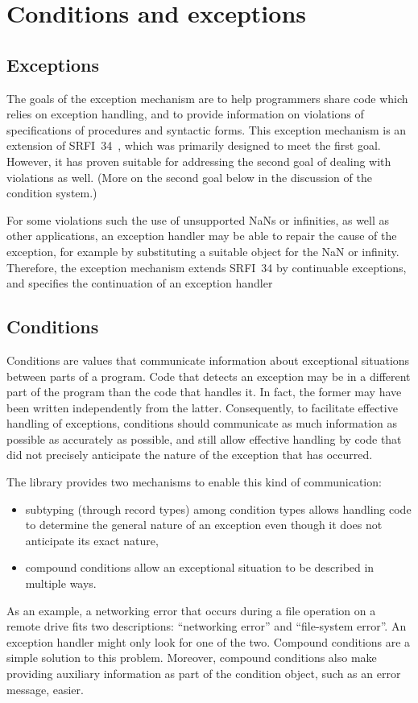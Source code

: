 \documentclass[twoside,twocolumn]{algol60}
\begin{document}
\chapter{Conditions and exceptions}

\section{Exceptions}

The goals of the exception mechanism are to help programmers share
code which relies on exception handling, and to provide information on
violations of specifications of procedures and syntactic forms.  This
exception mechanism is an extension of SRFI~34~\cite{srfi34}, which
was primarily designed to meet the first goal.  However, it has proven
suitable for addressing the second goal of dealing with violations as
well.   (More on the second goal below in the discussion of the
condition system.)

For some violations such the use of unsupported NaNs or infinities, as
well as other applications, an exception handler may be able to
repair the cause of the exception, for example by substituting a
suitable object for the NaN or infinity.  Therefore, the exception
mechanism extends SRFI~34 by continuable exceptions, and specifies the
continuation of an exception handler

\section{Conditions}

Conditions are values that communicate information about exceptional
situations between parts of a program. Code that detects an exception
may be in a different part of the program than the code that handles
it. In fact, the former may have been written independently from the
latter.  Consequently, to facilitate effective handling of exceptions,
conditions should communicate as much information as possible as
accurately as possible, and still allow effective handling by code
that did not precisely anticipate the nature of the exception that has
occurred.

The  library provides two mechanisms to
enable this kind of communication:
%
\begin{itemize}
\item subtyping (through record types) among condition types allows
  handling code to determine the general nature of an exception even
  though it does not anticipate its exact nature,
\item compound conditions allow an exceptional situation to be
  described in multiple ways.
\end{itemize}
%
As an example, a networking error that occurs during a file operation
on a remote drive fits two descriptions: ``networking error'' and
``file-system error''.  An exception handler might only look for one of
the two.  Compound conditions are a simple solution to this problem.
Moreover, compound conditions also make providing auxiliary
information as part of the condition object, such as an error message,
easier.
\end{document}
